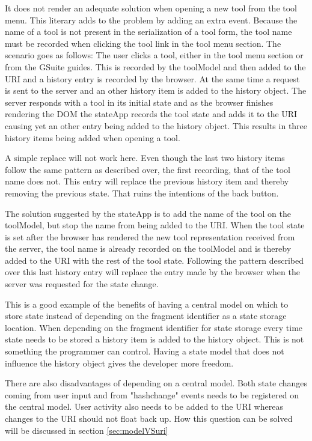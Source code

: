 \documentclass[english]{ifimaster}
\begin{document}
It does not render an adequate solution when opening a new tool from the tool menu. This literary adds to the problem by adding an extra event. Because the name of a tool is not present in the serialization of a tool form, the tool name must be recorded when clicking the tool link in the tool menu section. The scenario goes as follows: The user clicks a tool, either in the tool menu section or from the GSuite guides. This is recorded by the toolModel and then added to the URI and a history entry is recorded by the browser. At the same time a request is sent to the server and an other history item is added to the history object. The server responds with a tool in its initial state and as the browser finishes rendering the DOM the stateApp records the tool state and adds it to the URI causing yet an other entry being added to the history object. This results in three history items being added when opening a tool. 

A simple replace will not work here. Even though the last two history items follow the same pattern as described over, the first recording, that of the tool name does not. This entry will replace the previous history item and thereby removing the previous state. That ruins the intentions of the back button. 

The solution suggested by the stateApp is to add the name of the tool on the toolModel, but stop the name from being added to the URI. When the tool state is set after the browser has rendered the new tool representation received from the server, the tool name is already recorded on the toolModel and is thereby added to the URI with the rest of the tool state. Following the pattern described over this last history entry will replace the entry made by the browser when the server was requested for the state change. 

This is a good example of the benefits of having a central model on which to store state instead of depending on the fragment identifier as a state storage location. When depending on the fragment identifier for state storage every time state needs to be stored a history item is added to the history object. This is not something the programmer can control. Having a state model that does not influence the history object gives the developer more freedom. 


There are also disadvantages of depending on a central model. Both state changes coming from user input and from "hashchange" events needs to be registered on the central model. User activity also needs to be added to the URI whereas changes to the URI should not float back up. How this question can be solved will be discussed in section \ref{sec:modelVSuri} 
\end{document}
